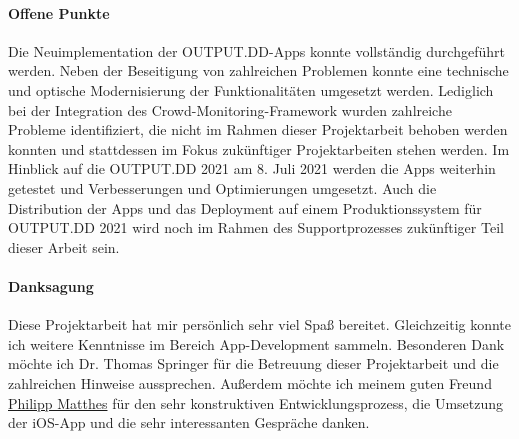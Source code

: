 \newpage

\paragraph{Offene Punkte} Die Neuimplementation der OUTPUT.DD-Apps konnte vollständig durchgeführt werden. Neben der Beseitigung von zahlreichen Problemen konnte eine technische und optische Modernisierung der Funktionalitäten umgesetzt werden. Lediglich bei der Integration des Crowd-Monitoring-Framework wurden zahlreiche Probleme identifiziert, die nicht im Rahmen dieser Projektarbeit behoben werden konnten und stattdessen im Fokus zukünftiger Projektarbeiten stehen werden. Im Hinblick auf die OUTPUT.DD 2021 am 8. Juli 2021 werden die Apps weiterhin getestet und Verbesserungen und Optimierungen umgesetzt. Auch die Distribution der Apps und das Deployment auf einem Produktionssystem für OUTPUT.DD 2021 wird noch im Rahmen des Supportprozesses zukünftiger Teil dieser Arbeit sein.

\paragraph{Danksagung}
Diese Projektarbeit hat mir persönlich sehr viel Spaß bereitet. Gleichzeitig konnte ich weitere Kenntnisse im Bereich App-Development sammeln. Besonderen Dank möchte ich Dr. Thomas Springer für die Betreuung dieser Projektarbeit und die zahlreichen Hinweise aussprechen. Außerdem möchte ich meinem guten Freund 
\hyperref[https://philippmatth.es]{Philipp Matthes} für den sehr konstruktiven Entwicklungsprozess, die Umsetzung der iOS-App und die sehr interessanten Gespräche danken.

